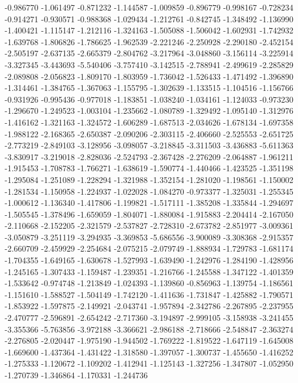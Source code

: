 -0.986770
-1.061497
-0.871232
-1.144587
-1.009859
-0.896779
-0.998167
-0.728234
-0.914271
-0.930571
-0.988368
-1.029434
-1.212761
-0.842745
-1.348492
-1.136990
-1.400421
-1.115147
-1.212116
-1.324163
-1.505088
-1.506042
-1.602931
-1.742932
-1.639768
-1.806826
-1.786625
-1.962539
-2.221246
-2.250928
-2.290180
-2.452154
-2.505197
-2.637135
-2.665379
-2.804762
-3.217964
-3.048860
-3.156114
-3.225914
-3.327345
-3.443693
-5.540406
-3.757410
-3.142515
-2.788941
-2.499619
-2.285829
-2.089808
-2.056823
-1.809170
-1.803959
-1.736042
-1.526433
-1.471492
-1.396890
-1.314461
-1.384765
-1.367063
-1.155795
-1.302639
-1.133515
-1.104516
-1.156766
-0.931926
-0.995436
-0.977018
-1.183851
-1.038240
-1.034161
-1.124033
-0.973230
-1.296670
-1.249523
-1.003104
-1.235662
-1.080789
-1.329492
-1.095140
-1.312976
-1.416162
-1.321163
-1.324572
-1.606289
-1.687513
-2.034626
-1.678134
-1.697358
-1.988122
-2.168365
-2.650387
-2.090206
-2.303115
-2.406660
-2.525553
-2.651725
-2.773219
-2.849103
-3.128956
-3.098057
-3.218845
-3.311503
-3.436883
-5.611363
-3.830917
-3.219018
-2.828036
-2.524793
-2.367428
-2.276209
-2.064887
-1.961211
-1.915453
-1.708783
-1.766271
-1.638619
-1.590774
-1.440466
-1.423525
-1.351198
-1.295084
-1.251089
-1.228294
-1.321988
-1.352154
-1.281020
-1.198561
-1.150002
-1.281534
-1.150958
-1.224937
-1.022028
-1.084270
-0.973377
-1.325031
-1.255345
-1.000612
-1.136340
-1.417806
-1.199821
-1.517111
-1.385208
-1.335844
-1.294697
-1.505545
-1.378496
-1.659059
-1.804071
-1.880084
-1.915883
-2.204414
-2.167050
-2.110668
-2.152205
-2.321579
-2.537827
-2.728310
-2.673782
-2.851977
-3.009361
-3.050879
-3.251119
-3.294935
-3.369853
-5.686556
-3.900089
-3.308368
-2.915357
-2.660709
-2.459929
-2.254684
-2.075215
-2.079749
-1.888934
-1.729783
-1.681174
-1.704355
-1.649165
-1.630678
-1.527993
-1.639490
-1.242976
-1.284190
-1.428956
-1.245165
-1.307433
-1.159487
-1.239351
-1.216766
-1.245588
-1.347122
-1.401359
-1.533642
-0.974748
-1.213849
-1.024393
-1.139860
-0.856963
-1.139754
-1.186561
-1.151610
-1.588527
-1.504149
-1.742120
-1.411636
-1.731847
-1.425882
-1.790571
-1.853922
-1.597875
-2.149921
-2.043741
-1.957894
-2.342786
-2.267895
-2.237955
-2.470777
-2.596891
-2.654242
-2.717360
-3.194897
-2.999105
-3.158938
-3.241455
-3.355366
-5.763856
-3.972188
-3.366621
-2.986188
-2.718666
-2.548847
-2.363274
-2.276805
-2.020447
-1.975190
-1.944502
-1.769222
-1.819522
-1.647119
-1.645008
-1.669600
-1.437364
-1.431422
-1.318580
-1.397057
-1.300737
-1.455650
-1.416252
-1.275333
-1.120672
-1.109202
-1.412941
-1.125143
-1.327256
-1.347807
-1.052950
-1.270739
-1.346864
-1.170331
-1.244736
